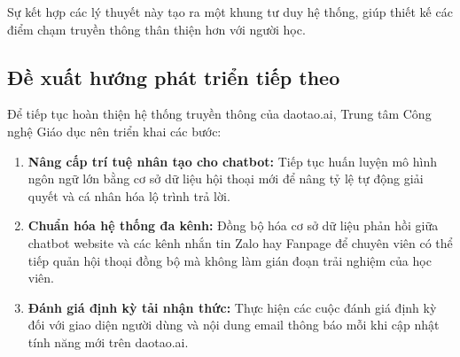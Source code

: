 Sự kết hợp các lý thuyết này tạo ra một khung tư duy hệ thống, giúp thiết kế các điểm chạm truyền thông thân thiện hơn với người học.

\subsection{Đề xuất hướng phát triển tiếp theo}

Để tiếp tục hoàn thiện hệ thống truyền thông của daotao.ai, Trung tâm Công nghệ Giáo dục nên triển khai các bước:
\begin{enumerate}
    \item \textbf{Nâng cấp trí tuệ nhân tạo cho chatbot:} Tiếp tục huấn luyện mô hình ngôn ngữ lớn bằng cơ sở dữ liệu hội thoại mới để nâng tỷ lệ tự động giải quyết và cá nhân hóa lộ trình trả lời.
    \item \textbf{Chuẩn hóa hệ thống đa kênh:} Đồng bộ hóa cơ sở dữ liệu phản hồi giữa chatbot website và các kênh nhắn tin Zalo hay Fanpage để chuyên viên có thể tiếp quản hội thoại đồng bộ mà không làm gián đoạn trải nghiệm của học viên.
    \item \textbf{Đánh giá định kỳ tải nhận thức:} Thực hiện các cuộc đánh giá định kỳ đối với giao diện người dùng và nội dung email thông báo mỗi khi cập nhật tính năng mới trên daotao.ai.
\end{enumerate}
